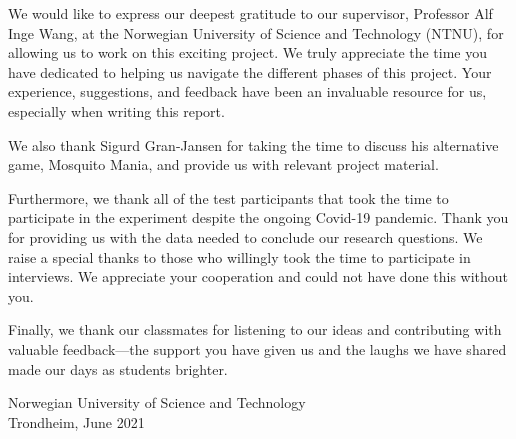 \documentclass[../Main.tex]{subfiles}
\begin{document}
\vspace*{2\baselineskip}

We would like to express our deepest gratitude to our supervisor, Professor Alf Inge Wang, at the Norwegian University of Science and Technology (NTNU), for allowing us to work on this exciting project. We truly appreciate the time you have dedicated to helping us navigate the different phases of this project. Your experience, suggestions, and feedback have been an invaluable resource for us, especially when writing this report.

We also thank Sigurd Gran-Jansen for taking the time to discuss his alternative game, Mosquito Mania, and provide us with relevant project material.

Furthermore, we thank all of the test participants that took the time to participate in the experiment despite the ongoing Covid-19 pandemic. Thank you for providing us with the data needed to conclude our research questions. We raise a special thanks to those who willingly took the time to participate in interviews. We appreciate your cooperation and could not have done this without you. 

Finally, we thank our classmates for listening to our ideas and contributing with valuable feedback—the support you have given us and the laughs we have shared made our days as students brighter.


\vspace*{4\baselineskip}

\center Norwegian University of Science and Technology\\

\center Trondheim, June 2021
\vspace*{2\baselineskip}


\makeatletter
\newcommand*{\textoverline}[1]{$\overline{\hbox{#1}}\m@th$}
\makeatother

\makebox[2.5in]{\hrulefill}  \qquad \qquad \qquad \makebox[2.5in]{\hrulefill}

 \qquad \qquad \qquad  {}
\end{document}
